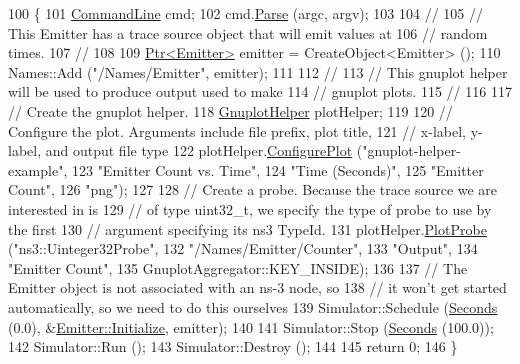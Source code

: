 \begin{DoxyCode}
100 \{
101   \hyperlink{classns3_1_1CommandLine}{CommandLine} cmd;
102   cmd.\hyperlink{classns3_1_1CommandLine_a5c10b85b3207e5ecb48d907966923156}{Parse} (argc, argv);
103 
104   \textcolor{comment}{//}
105   \textcolor{comment}{// This Emitter has a trace source object that will emit values at}
106   \textcolor{comment}{// random times.}
107   \textcolor{comment}{//}
108 
109   \hyperlink{classns3_1_1Ptr}{Ptr<Emitter>} emitter = CreateObject<Emitter> ();
110   Names::Add (\textcolor{stringliteral}{"/Names/Emitter"}, emitter);
111 
112   \textcolor{comment}{//}
113   \textcolor{comment}{// This gnuplot helper will be used to produce output used to make}
114   \textcolor{comment}{// gnuplot plots.}
115   \textcolor{comment}{//}
116 
117   \textcolor{comment}{// Create the gnuplot helper.}
118   \hyperlink{classns3_1_1GnuplotHelper}{GnuplotHelper} plotHelper;
119 
120   \textcolor{comment}{// Configure the plot.  Arguments include file prefix, plot title,}
121   \textcolor{comment}{// x-label, y-label, and output file type}
122   plotHelper.\hyperlink{classns3_1_1GnuplotHelper_a05a9beecc9f5ece76cda792daeea6fc3}{ConfigurePlot} (\textcolor{stringliteral}{"gnuplot-helper-example"},
123                             \textcolor{stringliteral}{"Emitter Count vs. Time"},
124                             \textcolor{stringliteral}{"Time (Seconds)"},
125                             \textcolor{stringliteral}{"Emitter Count"},
126                             \textcolor{stringliteral}{"png"});
127 
128   \textcolor{comment}{// Create a probe.  Because the trace source we are interested in is }
129   \textcolor{comment}{// of type uint32\_t, we specify the type of probe to use by the first}
130   \textcolor{comment}{// argument specifying its ns3 TypeId.}
131   plotHelper.\hyperlink{classns3_1_1GnuplotHelper_a755eeb654e6d2c3ab3ab9674e21480f9}{PlotProbe} (\textcolor{stringliteral}{"ns3::Uinteger32Probe"},
132                         \textcolor{stringliteral}{"/Names/Emitter/Counter"},
133                         \textcolor{stringliteral}{"Output"},
134                         \textcolor{stringliteral}{"Emitter Count"},
135                         GnuplotAggregator::KEY\_INSIDE);
136 
137   \textcolor{comment}{// The Emitter object is not associated with an ns-3 node, so}
138   \textcolor{comment}{// it won't get started automatically, so we need to do this ourselves}
139   Simulator::Schedule (\hyperlink{group__timecivil_ga33c34b816f8ff6628e33d5c8e9713b9e}{Seconds} (0.0), &\hyperlink{classns3_1_1Object_af4411cb29971772fcd09203474a95078}{Emitter::Initialize}, emitter);
140 
141   Simulator::Stop (\hyperlink{group__timecivil_ga33c34b816f8ff6628e33d5c8e9713b9e}{Seconds} (100.0));
142   Simulator::Run ();
143   Simulator::Destroy ();
144 
145   \textcolor{keywordflow}{return} 0;
146 \}
\end{DoxyCode}


